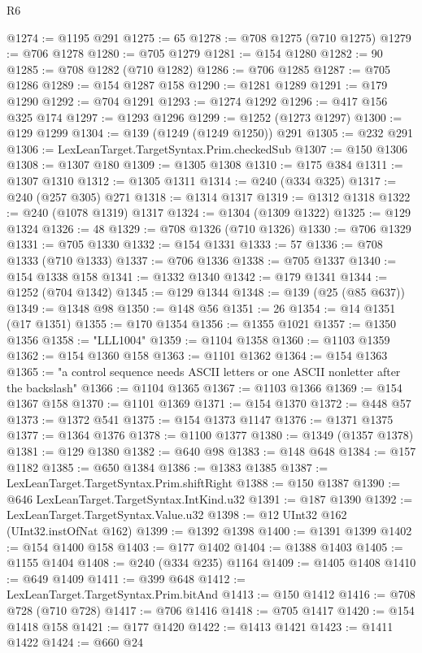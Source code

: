 \begin{lexlean}{R6}
\begin{coremodule}
{{{{{{{{{{{{{{{{{{{{{{{{{{{{{{{{{{{{{{{{{{{{{{{{{{{{{{{{{{{{{{{{{{{{{{{{@1274 := @1195 @291
@1275 := 65
@1278 := @708 @1275 (@710 @1275)
@1279 := @706 @1278
@1280 := @705 @1279
@1281 := @154 @1280
@1282 := 90
@1285 := @708 @1282 (@710 @1282)
@1286 := @706 @1285
@1287 := @705 @1286
@1289 := @154 @1287 @158
@1290 := @1281 @1289
@1291 := @179 @1290
@1292 := @704 @1291
@1293 := @1274 @1292
@1296 := @417 @156 @325 @174
@1297 := @1293 @1296
@1299 := @1252 (@1273 @1297)
@1300 := @129 @1299
@1304 := @139 (@1249 (@1249 @1250)) @291
@1305 := @232 @291
@1306 := LexLeanTarget.TargetSyntax.Prim.checkedSub
@1307 := @150 @1306
@1308 := @1307 @180
@1309 := @1305 @1308
@1310 := @175 @384
@1311 := @1307 @1310
@1312 := @1305 @1311
@1314 := @240 (@334 @325)
@1317 := @240 (@257 @305) @271
@1318 := @1314 @1317
@1319 := @1312 @1318
@1322 := @240 (@1078 @1319) @1317
@1324 := @1304 (@1309 @1322)
@1325 := @129 @1324
@1326 := 48
@1329 := @708 @1326 (@710 @1326)
@1330 := @706 @1329
@1331 := @705 @1330
@1332 := @154 @1331
@1333 := 57
@1336 := @708 @1333 (@710 @1333)
@1337 := @706 @1336
@1338 := @705 @1337
@1340 := @154 @1338 @158
@1341 := @1332 @1340
@1342 := @179 @1341
@1344 := @1252 (@704 @1342)
@1345 := @129 @1344
@1348 := @139 (@25 (@85 @637))
@1349 := @1348 @98
@1350 := @148 @56
@1351 := 26
@1354 := @14 @1351 (@17 @1351)
@1355 := @170 @1354
@1356 := @1355 @1021
@1357 := @1350 @1356
@1358 := "LLL1004"
@1359 := @1104 @1358
@1360 := @1103 @1359
@1362 := @154 @1360 @158
@1363 := @1101 @1362
@1364 := @154 @1363
@1365 := "a control sequence needs ASCII letters or one ASCII nonletter after the backslash"
@1366 := @1104 @1365
@1367 := @1103 @1366
@1369 := @154 @1367 @158
@1370 := @1101 @1369
@1371 := @154 @1370
@1372 := @448 @57
@1373 := @1372 @541
@1375 := @154 @1373 @1147
@1376 := @1371 @1375
@1377 := @1364 @1376
@1378 := @1100 @1377
@1380 := @1349 (@1357 @1378)
@1381 := @129 @1380
@1382 := @640 @98
@1383 := @148 @648
@1384 := @157 @1182
@1385 := @650 @1384
@1386 := @1383 @1385
@1387 := LexLeanTarget.TargetSyntax.Prim.shiftRight
@1388 := @150 @1387
@1390 := @646 LexLeanTarget.TargetSyntax.IntKind.u32
@1391 := @187 @1390
@1392 := LexLeanTarget.TargetSyntax.Value.u32
@1398 := @12 UInt32 @162 (UInt32.instOfNat @162)
@1399 := @1392 @1398
@1400 := @1391 @1399
@1402 := @154 @1400 @158
@1403 := @177 @1402
@1404 := @1388 @1403
@1405 := @1155 @1404
@1408 := @240 (@334 @235) @1164
@1409 := @1405 @1408
@1410 := @649 @1409
@1411 := @399 @648
@1412 := LexLeanTarget.TargetSyntax.Prim.bitAnd
@1413 := @150 @1412
@1416 := @708 @728 (@710 @728)
@1417 := @706 @1416
@1418 := @705 @1417
@1420 := @154 @1418 @158
@1421 := @177 @1420
@1422 := @1413 @1421
@1423 := @1411 @1422
@1424 := @660 @24
}}}}}}}}}}}}}}}}}}}}}}}}}}}}}}}}}}}}}}}}}}}}}}}}}}}}}}}}}}}}}}}}}}}}}}}}
\end{coremodule}
\end{lexlean}
